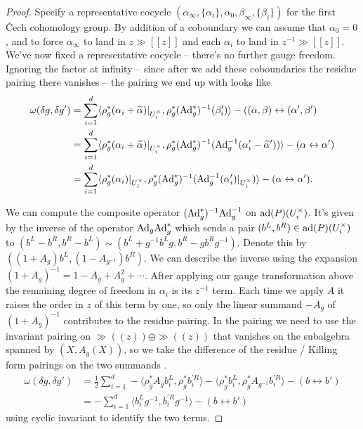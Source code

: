 \documentclass[10pt, oneside]{article}
\newcommand{\Ad}{\mr{Ad}}
\begin{document}
\begin{proof}
 Specify a representative cocycle $(\alpha_\infty, \{\alpha_i\}, \alpha_0, \beta_\infty, \{\beta_i\})$ for the first \v Cech cohomology group. By addition of a coboundary we can assume that $\alpha_0=0$, and to force $\alpha_\infty$ to land in $z\gg[[z]]$ and each $\alpha_i$ to land in $z^{-1}\gg[[z]]$.  We've now fixed a representative cocycle -- there's no further gauge freedom.  Ignoring the factor at infinity -- since after we add these coboundaries the residue pairing there vanishes -- the pairing we end up with looks like 
\begin{align*}
\omega(\delta g, \delta g') &= \sum_{i=1}^d \langle \rho_g^*(\alpha_i + \wt \alpha)|_{U^\times_i},\rho_g^* (\Ad_g^*)^{-1}( \beta'_i) \rangle - ((\alpha,\beta) \leftrightarrow (\alpha',\beta')\\ 
&= \sum_{i=1}^d \langle \rho_g^*(\alpha_i + \wt \alpha)|_{U^\times_i}, \rho_g^*(\Ad_g^*)^{-1}(\Ad_g^{-1}(\alpha_i' - \wt \alpha')) \rangle - (\alpha \leftrightarrow \alpha')\\
&= \sum_{i=1}^d \langle \rho_g^*(\alpha_i)|_{U^\times_i}, \rho_g^*(\Ad_g^*)^{-1}(\Ad_g^{-1}(\alpha_i')|_{U^\times_i}) \rangle - (\alpha \leftrightarrow \alpha').
\end{align*}

We can compute the composite operator $(\Ad_g^*)^{-1}\Ad_g^{-1}$ on $\mathrm{ad}(P)(U^\times_i)$.  It's given by the inverse of the operator $\Ad_g\Ad_g^*$ which sends a pair $(b^L, b^R) \in \mathrm{ad}(P)(U^\times_i)$ to $(b^L - b^R, b^R - b^L) \sim (b^L + g^{-1} b^L g, b^R - g b^R g^{-1})$.  Denote this by $((1+A_g)b^L,(1-A_{g^{-1}})b^R)$.  We can describe the inverse using the expansion $(1+A_g)^{-1} = 1 - A_g + A_g^2 + \cdots$.  After applying our gauge transformation above the remaining degree of freedom in $\alpha_i$ is its $z^{-1}$ term.  Each time we apply $A$ it raises the order in $z$ of this term by one, so only the linear summand $-A_g$ of $(1+A_g)^{-1}$ contributes to the residue pairing.  In the pairing we need to use the invariant pairing on $\gg((z)) \oplus \gg((z))$ that vanishes on the subalgebra spanned by $(X, A_g(X))$, so we take the difference of the residue / Killing form pairings on the two summands .
\begin{align*}
\omega(\delta g, \delta g') &= \frac 12 \sum_{i=1}^d  - \langle \rho_g^*A_g b^L_i, \rho_g^*b^{'R}_i \rangle - \langle \rho_g^*b^L_i, \rho_g^*A_{g^{-1}}b^{'R}_i \rangle- (b \leftrightarrow b') \\ 
&= - \sum_{i=1}^d \langle b^L_ig^{-1}, b^{'R}_i g^{-1} \rangle  - (b \leftrightarrow b')
\end{align*}
using cyclic invariant to identify the two terms. 
\end{proof}
\end{document}
